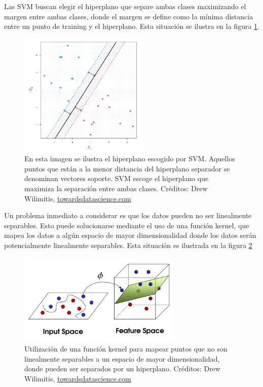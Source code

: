 Las SVM buscan elegir el hiperplano que separe ambas clases maximizando el margen entre ambas clases, donde el margen se define como la mínima distancia entre un punto de training y el hiperplano. Esta situación se ilustra en la figura \ref{fig:svm_3}. \\

\begin{figure}[h!]
\begin{center}
  \includegraphics[width=0.56\textwidth]{Kap1/svm3.png} 
  \end{center}
 \caption{En esta imagen se ilustra el hiperplano escogido por SVM. Aquellos puntos que están a la menor distancia del hiperplano separador se denominan vectores soporte. SVM escoge el hiperplano que maximiza la separación entre ambas clases. Créditos: Drew Wilimitis, \url{towardsdatascience.com}}
\label{fig:svm_3}
\end{figure}


Un problema inmediato a considerar es que los datos pueden no ser linealmente separables. Esto puede solucionarse mediante el uso de una función kernel, que mapea los datos a algún espacio de mayor dimensionalidad donde los datos serán potencialmente linealmente separables. Esta situación es ilustrada en la figura \ref{fig:svm_4}\\

\begin{figure}[h!]
\begin{center}
  \includegraphics[width=0.7\textwidth]{Kap1/svm5.png} 
  \end{center}
 \caption{ Utilización de una función kernel para mapear puntos que no son linealmente separables a un espacio de mayor dimensionalidad, donde pueden ser separados por un hiperplano. Créditos: Drew Wilimitis, \url{towardsdatascience.com} }
\label{fig:svm_4}
\end{figure}

